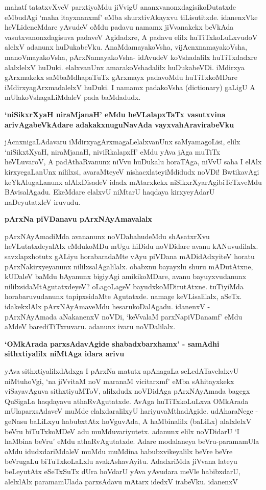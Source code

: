 mahatf tatatxvXveV parxtiyoMdu jiVvigU ananxvanonxdagisikoDutatxde eMbudAgi `maha itayxnanxmf' eMba shurxtivAkayxvu tiLisutitxde. idanenxVke heVLideneMdare yAvudeV oMdu padavu namamx jiVvanakekx beVkAda vasutxvanonxdagisuva padaveV Agidadxre, A padavu elilx huTiTxkoLuLxvudoV alelxV adanunx huDukabeVku. AnaMdamayakoVsha, vijAcnxnamayakoVsha, manoVmayakoVsha, pArxNamayakoVsha- idAvudeV koVshadalilx huTiTxdadxre alalxlelxV huDuki. elalxvanUnx amarakoVshadalilx huDukabeVDi. iMdirxya gArxmakekx saMbaMdhapaTuTx gArxmayx padavoMdu huTiTxkoMDare iMdirxyagArxmadalelxV huDuki. I namamx padakoVsha {\rm (dictionary)} gaLigU A mUlakoVshagaLiMdaleV pada baMdadudx.

\noindent
{\bf\large{`niSikxrXyaH niraMjanaH' eMdu heVLalapxTaTx vasutxvina arivAgabeVkAdare adakakxnuguNavAda vayxvahAravirabeVku}}

jAcnxnigaLAdavaru iMdirxyagArxmagaLelalxvanUnx saMyamagoLisi, elilx `niSikxtXyaH, niraMjanaH, niviRkalapxH' eMdu yAva jAga muTiTx heVLuvaroV, A padAthaRvanunx niVvu huDukalu horaTAga, niVvU saha I elAlx kirxyegaLanUnx nililxsi, avaraMteyeV nishacxlateyiMdidudx noVDi! BwtikavAgi keYkAlugaLanunx alAlxDisadeV idadx mAtarxkekx niSikxrXyarAgibiTeTxveMdu BAvisalAgadu. EkeMdare elalxvU niMtarU haqdaya kirxyeyAdarU naDeyutatxleV iruvudu.

\noindent
{\bf\large{pArxNa piVDanavu pArxNAyAmavalalx}}\label{page202}

pArxNAyAmadiMda avananunx noVDabahudeMdu shAsatxrXvu heVLutatxdeyalAlx eMdukoMDu mUgu hiDidu noVDidare avanu kANuvudilalx. savxlapxhotutx gALiyu horabaradaMte vAyu piVDana mADidAdxyiteV horatu pArxNakirxyeyanunx nililxsalAgalilalx. obabxnu bayayxlu shuru mADutAtxne, kUDaleV baMdu bAyanunx bigiyAgi amikikoMDare, avanu bayuyxvudanunx nililxsidaMtAgutatxdeyeV? oLagoLageV bayudxkoMDirutAtxne. tuTiyiMda horabaruvudanunx tapipxsidaMte Agutatxde. namage keVLisalilalx, aSeTx. idakekxlAlx pArxNAyAmaveMdu hesarukoDalAgadu. idanenxV - pArxNAyAmada aNakanenxV noVDi, `keVvalaM parxNapiVDanamf' eMdu aMdeV barediTiTxruvaru. adanunx ivaru noVDalilalx.

\noindent
{\bf\large{`OMkArada parxsAdavAgide shabadxbarxhamx' - samAdhi sithxtiyalilx niMtAga idara arivu}}\label{page203}

yAva sithxtiyalilxdAdxga I pArxNa matutx apAnagaLa seLedATavelalxvU niMtuhoVgi, `na jiVvitaM noV maranaM vicitarxmf' eMba sAhitayxkekx viSayavAguva sithxtiyuMToV, alilxdudx noVDidAga pArxNAyAmada bagegx QuSigaLa haqdayavu athaRvAgutatxde. AvAga huTiTxkoLuLxva OMkArada mUlaparxsAdaveV muMde elalxdaralilxyU hariyuvaMthadAgide. udAharaNege - geNasu baLiLxyu habubxtAtx hoVguvAda, A haMbinalilx (baLiLx) alalxlelxV beVru biTuTxkoMDeV adu muMduvariyutetx. adanunx elilx noVDidarU `I haMbina beVru' eMdu athaRvAgutatxde. Adare modalaneya beVru-paramamUla oMdu idudxdariMdaleV muMdu muMdina habubxvikeyalilx beVre beVre beVrugaLu biTuTxkoLaLxlu avakAshavAyitu. AdadxriMda jiVvana lateyu beLeyutAtx eSeTxSuTx dUra hoVdarU yAva yAvudara meVle habibxdarU, alelxlAlx paramamUlada parxsAdavu mAtarx idedxV irabeVku. idanenxV

